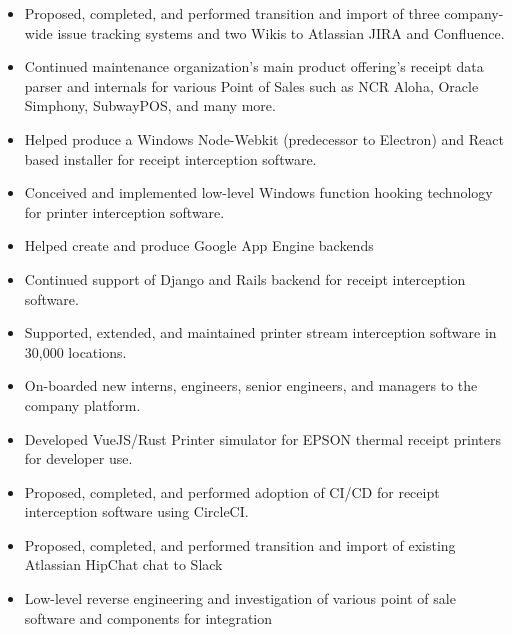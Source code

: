 \documentclass[10pt,letter,ragged2e]{altacv}
\begin{document}
\begin{paracol}{2}
\begin{itemize}
\item Proposed, completed, and performed transition and import of three company-wide issue tracking systems and two Wikis to Atlassian JIRA and Confluence.
\item Continued maintenance organization's main product offering's receipt data parser and internals for various Point of Sales such as NCR Aloha, Oracle Simphony, SubwayPOS, and many more.
\item Helped produce a Windows Node-Webkit (predecessor to Electron) and React based installer for receipt interception software.
\item Conceived and implemented low-level Windows function hooking technology for printer interception software.
\item Helped create and produce Google App Engine backends
\item Continued support of Django and Rails backend for receipt interception software.
\item Supported, extended, and maintained printer stream interception software in 30,000 locations.
\item On-boarded new interns, engineers, senior engineers, and managers to the company platform.
\item Developed VueJS/Rust Printer simulator for EPSON thermal receipt printers for developer use.
\item Proposed, completed, and performed adoption of CI/CD for receipt interception software using CircleCI.
\item Proposed, completed, and performed transition and import of existing Atlassian HipChat chat to Slack
\item Low-level reverse engineering and investigation of various point of sale software and components for integration
\end{itemize}

\divider


\end{paracol}
\end{document}
